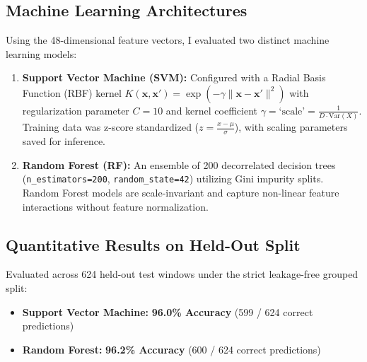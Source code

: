 \documentclass[11pt,a4paper]{article}
\begin{document}
\subsection{Machine Learning Architectures}
Using the 48-dimensional feature vectors, I evaluated two distinct machine learning models:
\begin{enumerate}
    \item \textbf{Support Vector Machine (SVM):} Configured with a Radial Basis Function (RBF) kernel $K(\mathbf{x}, \mathbf{x}') = \exp(-\gamma \|\mathbf{x} - \mathbf{x}'\|^2)$ with regularization parameter $C = 10$ and kernel coefficient $\gamma = \text{`scale'} = \frac{1}{D \cdot \text{Var}(X)}$. Training data was z-score standardized ($z = \frac{x - \mu}{\sigma}$), with scaling parameters saved for inference.
    \item \textbf{Random Forest (RF):} An ensemble of 200 decorrelated decision trees (\texttt{n\_estimators=200}, \texttt{random\_state=42}) utilizing Gini impurity splits. Random Forest models are scale-invariant and capture non-linear feature interactions without feature normalization.
\end{enumerate}

\subsection{Quantitative Results on Held-Out Split}
Evaluated across 624 held-out test windows under the strict leakage-free grouped split:
\begin{itemize}
    \item \textbf{Support Vector Machine:} \textbf{96.0\% Accuracy} (599 / 624 correct predictions)
    \item \textbf{Random Forest:} \textbf{96.2\% Accuracy} (600 / 624 correct predictions)
\end{itemize}
\end{document}
